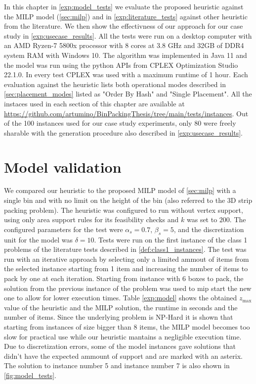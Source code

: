 In this chapter in \cref{exp:model_tests} we evaluate the proposed heuristic against the MILP model (\ref{sec:milp}) and in \cref{exp:literature_tests} against other heuristic from the literature. We then show the effectivness of our approach for our case study in \cref{exp:usecase_results}.
All the tests were run on a desktop computer with an AMD Ryzen-7 5800x processor with 8 cores at 3.8 GHz and 32GB of DDR4 system RAM with Windows 10. The algorithm was implemented in Java 11 and the model was run using the python APIs from CPLEX Optimization Studio 22.1.0.
In every test CPLEX was used with a maximum runtime of 1 hour.
Each evaluation against the heuristic lists both operational modes described in \cref{sec:placement_modes} listed as "Order By Hash" and "Single Placement".
All the instaces used in each section of this chapter are available at \url{https://github.com/artumino/BinPackingThesis/tree/main/tests/instances}.
Out of the 100 instances used for our case study experiments, only 80 were freely sharable with the generation procedure also described in \cref{exp:usecase_results}.

\section{Model validation}
We compared our heuristic to the proposed MILP model of \cref{sec:milp} with a single bin and with no limit on the height of the bin (also referred to the 3D strip packing problem).
The heuristic was configured to run without vertex support, using only area support rules for its feasibility checks and $k$ was set to $200$.
The configured parameters for the test were $\alpha_s = 0.7$, $\beta_s = 5$, and the discretization unit for the model was $\delta = 10$. 
Tests were run on the first instance of the class 1 problems of the literature tests described in \cref{def:class1_instances}.
The test was run with an iterative approach by selecting only a limited ammout of items from the selected instance starting from 1 item and increasing the number of items to pack by one at each iteration.
Starting from instance with 6 boxes to pack, the solution from the previous instance of the problem was used to mip start the new one to allow for lower execution times.
Table \ref{exp:model} shows the obtained $z_{\text{max}}$ value of the heuristic and the MILP solution, the runtime in seconds and the number of items.
Since the underlying problem is NP-Hard it is shown that starting from instances of size bigger than 8 items, the MILP model becomes too slow for practical use while our heuristic mantains a negligible execution time.
Due to discretization errors, some of the model instances gave solutions that didn't have the expected ammount of support and are marked with an asterix.
The solution to instance number 5 and instance number 7 is also shown in \cref{fig:model_tests}.
\label{exp:model_tests}



